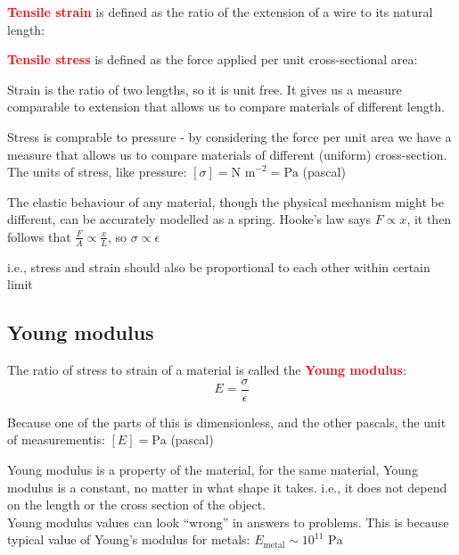 \documentclass[a4paper,12pt]{book}
\newenvironment{ilight}
  {\centering
  	\vspace*{6pt}
  	\begin{tcolorbox}[colframe=Gray,colback=LightGrey!15]
  \setlength{\baselineskip}{\baselineskip}%
  }
  {\end{tcolorbox}\vspace*{-4pt}}
\newcommand{\keypoint}[1]{\textbf{\textcolor{red}{#1}}}
\newcommand{\tcbhighmath}[1]{\boxed{#1}}
\newcommand{\keypoint}[1]{\textbf{\textcolor{red}{#1}}}
\begin{document}
\begin{ilight}
	\centering \keypoint{Tensile strain} is defined as the ratio of the extension of a wire to its natural length: 
\end{ilight}

\begin{ilight}
	\centering \keypoint{Tensile stress} is defined as the force applied per unit cross-sectional area: 
\end{ilight}

Strain is the ratio of two lengths, so it is unit free. It gives us a measure comparable to extension that allows us to compare materials of different length.

Stress is comprable to pressure - by considering the force per unit area we have a measure that allows us to compare materials of different (uniform) cross-section. The units of stress, like pressure: $[\sigma] = ^{-2} = $ (pascal)

The elastic behaviour of any material, though the physical mechanism might be different, can be accurately modelled as a spring. Hooke's law says $F \propto x$, it then follows that $ \propto {}$, so $\sigma \propto \epsilon$

i.e., stress and strain should also be proportional to each other within certain limit

\subsection{Young modulus}

\begin{ilight}
	\centering The ratio of stress to strain of a material is called the \keypoint{Young modulus}:\begin{equation*} 
 \tcbhighmath{E = \frac{\sigma}{\epsilon}} \end{equation*}
\end{ilight}

Because one of the parts of this is dimensionless, and the other pascals, the unit of measurementis: $[E] = $ (pascal)

Young modulus is a property of the material, for the same material, Young modulus is a constant, no matter in what shape it takes. i.e., it does not depend on the length or the cross section of the object.\\
Young modulus values can look ``wrong'' in answers to problems. This is because typical value of Young's modulus for metals: $E_ \sim 10^{11} $
\end{document}
